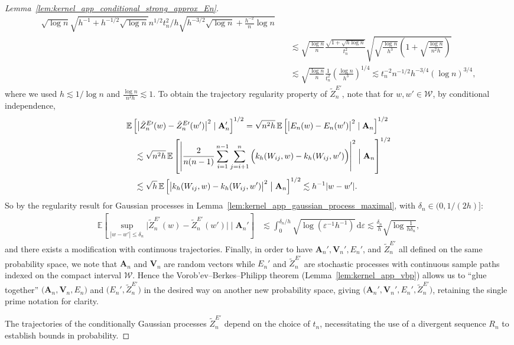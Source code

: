 \documentclass[11pt,lof]{puthesis}
\newcommand{\E}{\ensuremath{\mathbb{E}}}
\newcommand{\bA}{\ensuremath{\mathbf{A}}}
\newcommand{\bV}{\ensuremath{\mathbf{V}}}
\newcommand{\cW}{\ensuremath{\mathcal{W}}}
\newcommand{\diff}[1]{\,\mathrm{d}#1}
\theoremstyle{break}
\theoremstyle{proof}
\newtheorem{proof}{Proof}
\begin{document}
\begin{proof}[Lemma~\ref{lem:kernel_app_conditional_strong_approx_En}]
\begin{align*}
{\sqrt{\log n}
\sqrt{h^{-1} + h^{-1/2} \sqrt{\log n}}
}{n^{1/2} t_n^2 / h}
\sqrt{
h^{-3/2}
\sqrt{\log n}
+ \frac{h^{-2}}{n}
\log n} \\
&\quad\lesssim
\sqrt{\frac{\log n}{n}}
\frac{
\sqrt{1 + \sqrt{h \log n}}
}{t_n^2}
\sqrt{
\sqrt{\frac{\log n}{h^3}}
\left( 1 + \sqrt{\frac{\log n}{n^2 h}} \right)
} \\
&\quad\lesssim
\sqrt{\frac{\log n}{n}}
\frac{ 1 }{t_n^2}
\left(
\frac{\log n}{h^3}
\right)^{1/4}
\lesssim
t_n^{-2}
n^{-1/2}
h^{-3/4}
(\log n)^{3/4},
\end{align*}
%
where we used
$h \lesssim 1 / \log n$
and $\frac{\log n}{n^2 h} \lesssim 1$.
To obtain the trajectory regularity property of
$\tilde Z_n^{E\prime}$,
note that
for $w, w' \in \cW$,
by conditional independence,
%
\begin{align*}
&\E\left[
\big|
\tilde Z_n^{E\prime}(w)
- \tilde Z_n^{E\prime}(w')
\big|^2
\mid \bA_n'
\right]^{1/2}
=
\sqrt{n^2h} \,
\E\left[
\big|
E_n(w)
- E_n(w')
\big|^2
\mid \bA_n
\right]^{1/2} \\
&\quad\lesssim
\sqrt{n^2h} \,
\E\left[
\left|
\frac{2}{n(n-1)}
\sum_{i=1}^{n-1}
\sum_{j=i+1}^{n}
\Big(
k_h(W_{i j},w)
- k_h(W_{i j},w')
\Big)
\right|^2
\Bigm\vert \bA_n
\right]^{1/2} \\
&\quad\lesssim
\sqrt{h} \,
\E\left[
\big|
k_h(W_{i j},w)
- k_h(W_{i j},w')
\big|^2
\bigm\vert \bA_n
\right]^{1/2}
\lesssim
h^{-1} |w-w'|.
\end{align*}
%
So by the regularity result for Gaussian processes in
Lemma~\ref{lem:kernel_app_gaussian_process_maximal},
with $\delta_n \in (0, 1/(2h)]$:
%
\begin{align*}
\E\left[
\sup_{|w-w'| \leq \delta_n}
\big|
\tilde Z_n^{E\prime}(w)
- \tilde Z_n^{E\prime}(w')
\big|
\mid \bA_n'
\right]
&\lesssim
\int_0^{\delta_n/h}
\sqrt{\log (\varepsilon^{-1} h^{-1})}
\diff{\varepsilon}
\lesssim
\frac{\delta_n}{h}
\sqrt{\log \frac{1}{h\delta_n}},
\end{align*}
%
and there exists a modification with continuous trajectories.
Finally, in order to have $\bA_n', \bV_n', E_n'$, and $\tilde Z_n^{E\prime}$
all defined on the same probability space,
we note that $\bA_n$ and $\bV_n$ are random vectors
while $E_n'$ and $\tilde Z_n^{E\prime}$ are stochastic processes
with continuous sample paths indexed on the compact interval $\cW$.
Hence the Vorob'ev--Berkes--Philipp theorem (Lemma~\ref{lem:kernel_app_vbp})
allows us to ``glue together'' $\big(\bA_n, \bV_n, E_n\big)$
and $\big(E_n', \tilde Z_n^{E\prime}\big)$
in the desired way on another new probability space, giving
$\big(\bA_n', \bV_n', E_n', \tilde Z_n^{E\prime}\big)$,
retaining the single prime notation for clarity.

The trajectories of the conditionally Gaussian processes
$\tilde Z_n^{E\prime}$ depend on the choice of $t_n$,
necessitating the use of a divergent sequence $R_n$ to establish
bounds in probability.
\end{proof}
\end{document}
